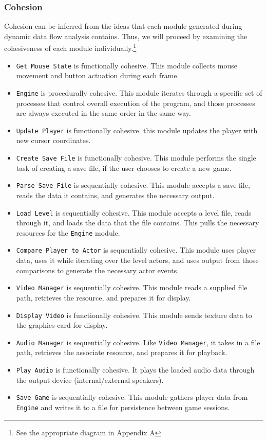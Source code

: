 \documentclass{article}
\begin{document}
		\subsubsection{Cohesion}
			Cohesion can be inferred from the ideas that each module generated during dynamic data flow analysis contains. Thus, we will proceed by examining the cohesiveness of each module individually.\footnote{See the appropriate diagram in Appendix A}
			\begin{itemize}
				\item \texttt{Get Mouse State} is functionally cohesive. This module collects mouse movement and button actuation during each frame. 
				\item \texttt{Engine} is procedurally cohesive. This module iterates through a specific set of processes that control overall execution of the program, and those processes are always executed in the same order in the same way. 
				\item \texttt{Update Player} is functionally cohesive. this module updates the player with new cursor coordinates. 
				\item \texttt{Create Save File} is functionally cohesive. This module performs the single task of creating a save file, if the user chooses to create a new game. 
				\item \texttt{Parse Save File} is sequentially cohesive. This module accepts a save file, reads the data it contains, and generates the necessary output. 
				\item \texttt{Load Level} is sequentially cohesive. This module accepts a level file, reads through it, and loads the data that the file contains. This pulls the necessary resources for the \texttt{Engine} module. 
				\item \texttt{Compare Player to Actor} is sequentially cohesive. This module uses player data, uses it while iterating over the level actors, and uses output from those comparisons to generate the necessary actor events. 
				\item \texttt{Video Manager} is sequentially cohesive. This module reads a supplied file path, retrieves the resource, and prepares it for display. 
				\item \texttt{Display Video} is functionally cohesive. This module sends texture data to the graphics card for display. 
				\item \texttt{Audio Manager} is sequentially cohesive. Like \texttt{Video Manager}, it takes in a file path, retrieves the associate resource, and prepares it for playback. 
				\item \texttt{Play Audio} is functionally cohesive. It plays the loaded audio data through the output device (internal/external speakers). 
				\item \texttt{Save Game} is sequentially cohesive. This module gathers player data from \texttt{Engine} and writes it to a file for persistence between game sessions. 
			\end{itemize}
\end{document}

